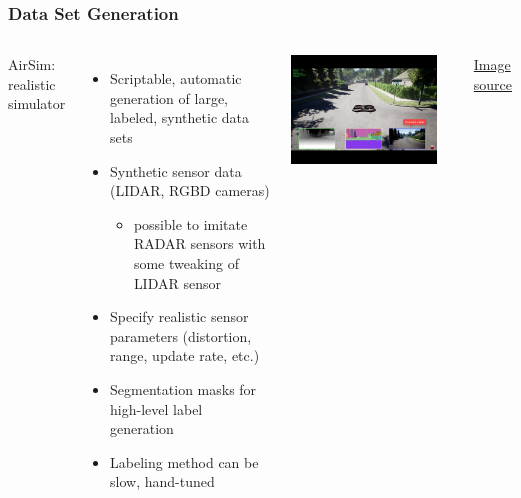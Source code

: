 \documentclass[aspectratio=169]{rubeamer}
\newif\ifpause
\newcommand{\mypause}{\ifpause \pause \fi}
\begin{document}
\begin{frame}
  \frametitle{Data Set Generation}
  \begin{columns}
      AirSim: realistic simulator
      \begin{itemize}
        \item Scriptable, automatic generation of large, labeled, synthetic data sets
        \mypause
        \item Synthetic sensor data (LIDAR, RGBD cameras)
        \mypause
        \begin{itemize}
          \item possible to imitate RADAR sensors with some tweaking of LIDAR sensor
        \end{itemize}
        \mypause
        \item Specify realistic sensor parameters (distortion, range, update rate, etc.)
        \mypause
        \item Segmentation masks for high-level label generation
        \mypause
        \item Labeling method can be slow, hand-tuned
      \end{itemize}
      \onslide
      \includegraphics[width=0.9\textwidth]{airsim}

      \href{https://mspoweruser.com/microsoft-launches-aerial-informatics-and-robotics-platform-to-help-developers-build-autonomous-systems/}{\color{blue}Image source}
    \centering
  \end{columns}
\end{frame}
\end{document}
